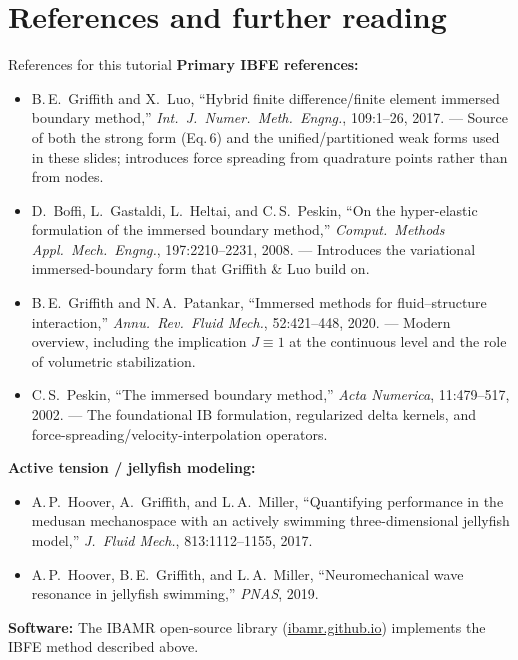 \documentclass[aspectratio=169]{beamer}
\begin{document}
\section{References and further reading}

\begin{frame}{References for this tutorial}
\footnotesize
\textbf{Primary IBFE references:}
\begin{itemize}
\item B.\,E.\ Griffith and X.\ Luo, ``Hybrid finite difference/finite element immersed boundary method,'' \emph{Int.\ J.\ Numer.\ Meth.\ Engng.}, 109:1--26, 2017. --- Source of both the strong form (Eq.\,6) and the unified/partitioned weak forms used in these slides; introduces force spreading from quadrature points rather than from nodes.
\item D.\ Boffi, L.\ Gastaldi, L.\ Heltai, and C.\,S.\ Peskin, ``On the hyper-elastic formulation of the immersed boundary method,'' \emph{Comput.\ Methods Appl.\ Mech.\ Engng.}, 197:2210--2231, 2008. --- Introduces the variational immersed-boundary form that Griffith \& Luo build on.
\item B.\,E.\ Griffith and N.\,A.\ Patankar, ``Immersed methods for fluid--structure interaction,'' \emph{Annu.\ Rev.\ Fluid Mech.}, 52:421--448, 2020. --- Modern overview, including the implication \(J\equiv 1\) at the continuous level and the role of volumetric stabilization.
\item C.\,S.\ Peskin, ``The immersed boundary method,'' \emph{Acta Numerica}, 11:479--517, 2002. --- The foundational IB formulation, regularized delta kernels, and force-spreading/velocity-interpolation operators.
\end{itemize}

\medskip
\textbf{Active tension / jellyfish modeling:}
\begin{itemize}
\item A.\,P.\ Hoover, A.\ Griffith, and L.\,A.\ Miller, ``Quantifying performance in the medusan mechanospace with an actively swimming three-dimensional jellyfish model,'' \emph{J.\ Fluid Mech.}, 813:1112--1155, 2017.
\item A.\,P.\ Hoover, B.\,E.\ Griffith, and L.\,A.\ Miller, ``Neuromechanical wave resonance in jellyfish swimming,'' \emph{PNAS}, 2019.
\end{itemize}

\medskip
\textbf{Software:} The IBAMR open-source library (\href{https://ibamr.github.io}{ibamr.github.io}) implements the IBFE method described above.
\end{frame}

\end{document}
